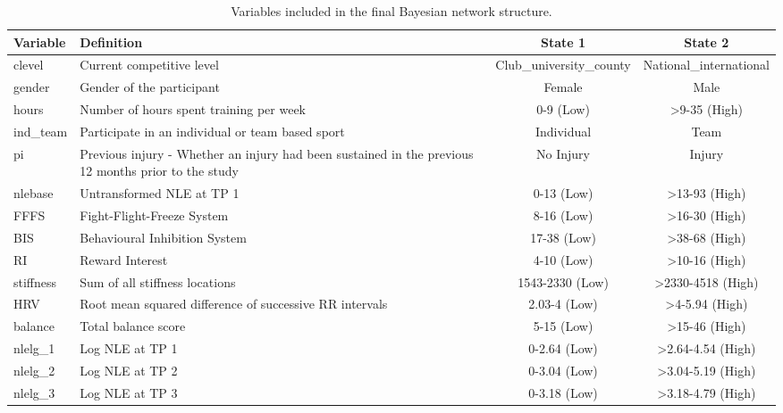 \documentclass[
  english,
  man]{apa6}
\begin{document}
\begin{table}[H]

\caption{\label{tab:table3}Variables included in the final Bayesian network structure.}
\centering
\begin{tabular}[t]{l|>{\raggedright\arraybackslash}p{5.2cm}|c|c}
\hline
Variable & Definition & State 1 & State 2\\
\hline
clevel & Current competitive level & Club\_university\_county & National\_international\\
\hline
gender & Gender of the participant & Female & Male\\
\hline
hours & Number of hours spent training per week & 0-9 (Low) & >9-35 (High)\\
\hline
ind\_team & Participate in an individual or team based sport & Individual & Team\\
\hline
pi & Previous injury - Whether an injury had been sustained in the previous 12 months prior to the study & No Injury & Injury\\
\hline
nlebase & Untransformed NLE at TP 1 & 0-13 (Low) & >13-93 (High)\\
\hline
FFFS & Fight-Flight-Freeze System & 8-16 (Low) & >16-30 (High)\\
\hline
BIS & Behavioural Inhibition System & 17-38 (Low) & >38-68 (High)\\
\hline
RI & Reward Interest & 4-10 (Low) & >10-16 (High)\\
\hline
stiffness & Sum of all stiffness locations & 1543-2330 (Low) & >2330-4518 (High)\\
\hline
HRV & Root mean squared difference of successive RR intervals & 2.03-4 (Low) & >4-5.94 (High)\\
\hline
balance & Total balance score & 5-15 (Low) & >15-46 (High)\\
\hline
nlelg\_1 & Log NLE at TP 1 & 0-2.64 (Low) & >2.64-4.54 (High)\\
\hline
nlelg\_2 & Log NLE at TP 2 & 0-3.04 (Low) & >3.04-5.19 (High)\\
\hline
nlelg\_3 & Log NLE at TP 3 & 0-3.18 (Low) & >3.18-4.79 (High)\\
\hline
\end{tabular}
\end{table}
\end{document}
